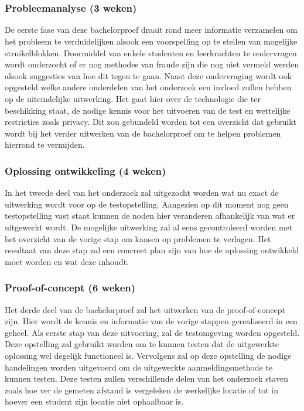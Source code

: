 
\chapter{}%
\label{ch:methodologie}

\subsection{Probleemanalyse (3 weken)}
De eerste fase van deze bachelorproef draait rond meer informatie verzamelen om het probleem te verduidelijken alsook een voorspelling op te stellen van mogelijke struikelblokken. Doormiddel van enkele studenten en leerkrachten te ondervragen wordt onderzocht of er nog methodes van fraude zijn die nog niet vermeld werden alsook suggesties van hoe dit tegen te gaan. Naast deze ondervraging wordt ook opgesteld welke andere onderdelen van het onderzoek een invloed zullen hebben op de uiteindelijke uitwerking. Het gaat hier over de technologie die ter beschikking staat, de nodige kennis voor het uitvoeren van de test en wettelijke restricties zoals privacy. Dit zou gebundeld worden tot een overzicht dat gebruikt wordt bij het verder uitwerken van de bachelorproef om te helpen problemen hierrond te vermijden.


\subsection{Oplossing ontwikkeling (4 weken)}
In het tweede deel van het onderzoek zal uitgezocht worden wat nu exact de uitwerking wordt voor op de testopstelling. Aangezien op dit moment nog geen testopstelling vast staat kunnen de noden hier veranderen afhankelijk van wat er uitgewerkt wordt. De mogelijke uitwerking zal al eens gecontroleerd worden met het overzicht van de vorige stap om kansen op problemen te verlagen. Het resultaat van deze stap zal een concreet plan zijn van hoe de oplossing ontwikkeld moet worden en  wat deze inhoudt.


\subsection{Proof-of-concept (6 weken)}
Het derde deel van de bachelorproef zal het uitwerken van de proof-of-concept zijn. Hier wordt de kennis en informatie van de vorige stappen gerealiseerd in een geheel. Als eerste stap van deze uitvoering, zal de testomgeving worden opgesteld. Deze opstelling zal gebruikt worden om te kunnen testen dat de uitgewerkte oplossing wel degelijk functioneel is. Vervolgens zal op deze opstelling de nodige handelingen worden uitgevoerd om de uitgewerkte aanmeldingsmethode te kunnen testen. Deze testen zullen verschillende delen van het onderzoek staven zoals hoe ver de gemeten afstand is vergeleken de werkelijke locatie of tot in hoever een student zijn locatie niet ophaalbaar is.


